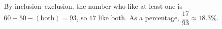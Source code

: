 By inclusion--exclusion, the number who like at least one is $60+50-(\text{both})=93$, so $\boxed{17}$ like both. As a percentage, $\dfrac{17}{93}\approx\boxed{18.3\%}$.
